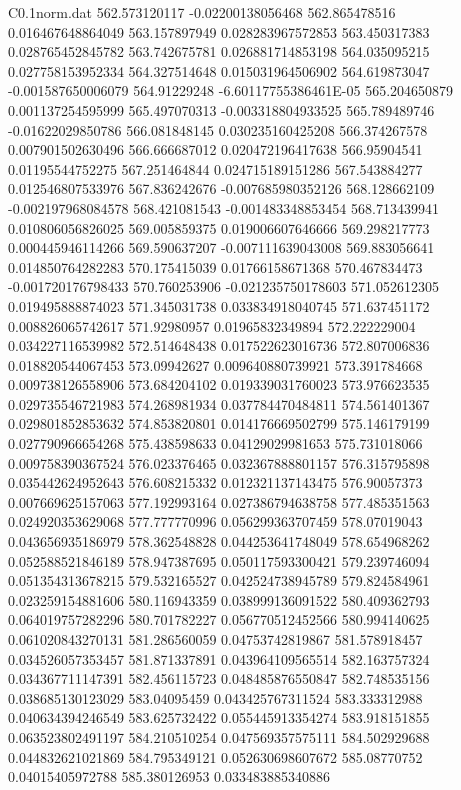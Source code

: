 \begin{filecontents}{C0.1norm.dat}
562.573120117		-0.02200138056468
562.865478516		0.016467648864049
563.157897949		0.028283967572853
563.450317383		0.028765452845782
563.742675781		0.026881714853198
564.035095215		0.027758153952334
564.327514648		0.015031964506902
564.619873047		-0.001587650006079
564.91229248		-6.60117755386461E-05
565.204650879		0.001137254595999
565.497070313		-0.003318804933525
565.789489746		-0.01622029850786
566.081848145		0.030235160425208
566.374267578		0.007901502630496
566.666687012		0.020472196417638
566.95904541		0.01195544752275
567.251464844		0.024715189151286
567.543884277		0.012546807533976
567.836242676		-0.007685980352126
568.128662109		-0.002197968084578
568.421081543		-0.001483348853454
568.713439941		0.010806056826025
569.005859375		0.019006607646666
569.298217773		0.000445946114266
569.590637207		-0.007111639043008
569.883056641		0.014850764282283
570.175415039		0.01766158671368
570.467834473		-0.001720176798433
570.760253906		-0.021235750178603
571.052612305		0.019495888874023
571.345031738		0.033834918040745
571.637451172		0.008826065742617
571.92980957		0.01965832349894
572.222229004		0.034227116539982
572.514648438		0.017522623016736
572.807006836		0.018820544067453
573.09942627		0.009640880739921
573.391784668		0.009738126558906
573.684204102		0.019339031760023
573.976623535		0.029735546721983
574.268981934		0.037784470484811
574.561401367		0.029801852853632
574.853820801		0.014176669502799
575.146179199		0.027790966654268
575.438598633		0.04129029981653
575.731018066		0.009758390367524
576.023376465		0.032367888801157
576.315795898		0.035442624952643
576.608215332		0.012321137143475
576.90057373		0.007669625157063
577.192993164		0.027386794638758
577.485351563		0.024920353629068
577.777770996		0.056299363707459
578.07019043		0.043656935186979
578.362548828		0.044253641748049
578.654968262		0.052588521846189
578.947387695		0.050117593300421
579.239746094		0.051354313678215
579.532165527		0.042524738945789
579.824584961		0.023259154881606
580.116943359		0.038999136091522
580.409362793		0.064019757282296
580.701782227		0.056770512452566
580.994140625		0.061020843270131
581.286560059		0.04753742819867
581.578918457		0.034526057353457
581.871337891		0.043964109565514
582.163757324		0.034367711147391
582.456115723		0.048485876550847
582.748535156		0.038685130123029
583.04095459		0.043425767311524
583.333312988		0.040634394246549
583.625732422		0.055445913354274
583.918151855		0.063523802491197
584.210510254		0.047569357575111
584.502929688		0.044832621021869
584.795349121		0.052630698607672
585.08770752		0.04015405972788
585.380126953		0.033483885340886

\end{filecontents}
